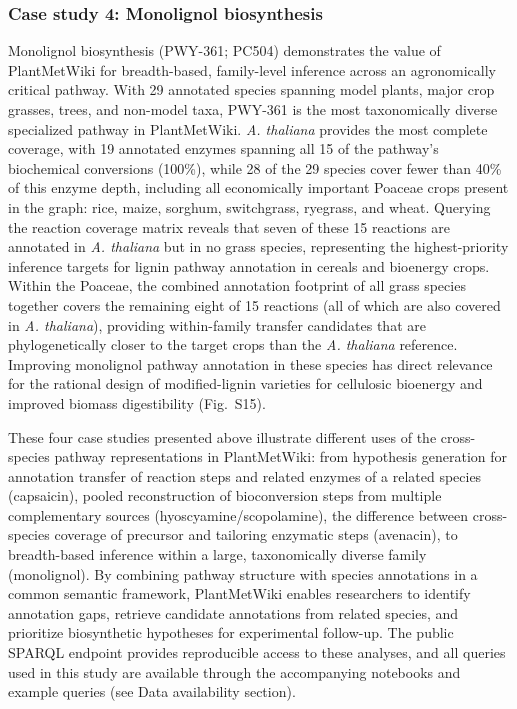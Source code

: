 \documentclass[11pt,a4paper]{article}
\begin{document}
\subsubsection*{Case study 4: Monolignol biosynthesis}
\vspace*{-1em}
Monolignol biosynthesis (PWY-361; PC504) demonstrates the value of PlantMetWiki for breadth-based,
family-level inference across an agronomically critical pathway. With 29 annotated species spanning
model plants, major crop grasses, trees, and non-model taxa, PWY-361 is the most taxonomically diverse
specialized pathway in PlantMetWiki. \textit{A. thaliana} provides the most complete coverage, with 19
annotated enzymes spanning all 15 of the pathway's biochemical conversions (100\%), while 28 of the 29
species cover fewer than 40\% of this enzyme depth, including all economically important Poaceae crops
present in the graph: rice, maize, sorghum, switchgrass, ryegrass, and wheat. Querying the reaction
coverage matrix reveals that seven of these 15 reactions are annotated in \textit{A. thaliana} but in
no grass species, representing the highest-priority inference targets for lignin pathway annotation in
cereals and bioenergy crops. Within the Poaceae, the combined annotation footprint of all grass
species together covers the remaining eight of 15 reactions (all of which are also covered in
\textit{A. thaliana}), providing within-family transfer candidates that are phylogenetically closer to
the target crops than the \textit{A. thaliana} reference. Improving monolignol pathway annotation in
these species has direct relevance for the rational design of modified-lignin varieties for cellulosic
bioenergy and improved biomass digestibility (Fig.~S15).

These four case studies presented above illustrate different uses of the cross-species pathway representations in
PlantMetWiki: from hypothesis generation for annotation transfer of reaction steps and related enzymes of
a related species (capsaicin), pooled reconstruction of bioconversion steps from multiple
complementary sources (hyoscyamine/scopolamine), the difference between cross-species coverage of
precursor and tailoring enzymatic steps (avenacin), to breadth-based inference within a large,
taxonomically diverse family (monolignol). By combining pathway structure with species annotations in
a common semantic framework, PlantMetWiki enables researchers to identify annotation gaps, retrieve
candidate annotations from related species, and prioritize biosynthetic hypotheses for experimental
follow-up. The public SPARQL endpoint provides reproducible access to these analyses, and all queries
used in this study are available through the accompanying notebooks and example queries (see Data
availability section).
\end{document}
